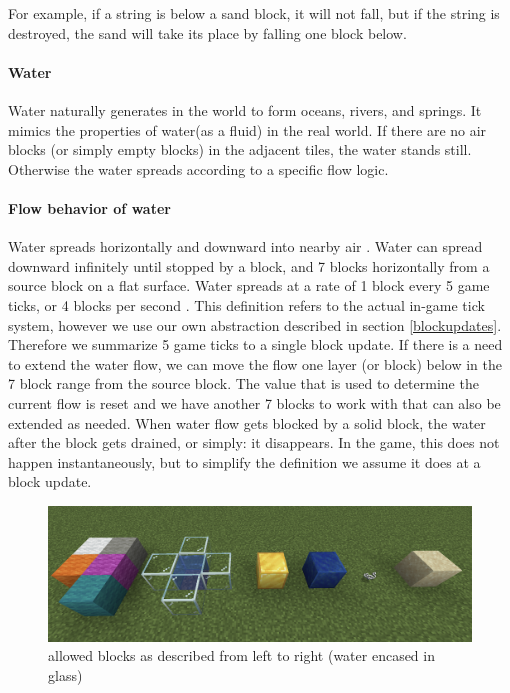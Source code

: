 \noindent \newline For example, if a string is below a sand block, it will not fall, but if the string is destroyed, the sand will take its place by falling one block below.

\pagebreak
\paragraph{Water}
Water naturally generates in the world to form oceans, rivers, and springs\cite{minecraftfandom:water}. 
It mimics the properties of water(as a fluid) in the real world.
If there are no air blocks (or simply empty blocks) in the adjacent tiles,
the water stands still. Otherwise the water spreads according to a specific flow logic.

\paragraph{Flow behavior of water}
Water spreads horizontally and downward into nearby air . Water can spread downward infinitely until stopped by a block, and 7 blocks horizontally from a source block on a flat surface. \newline Water spreads at a rate of 1 block every 5 game ticks, or 4 blocks per second \cite{minecraftfandom:waterspread}.\newline
\newline This definition refers to the actual in-game tick system, however we use our own abstraction described in section \ref{blockupdates}.
Therefore we summarize 5 game ticks to a single block update.
\newline If there is a need to extend the water flow, we can move the flow one layer (or block) below in the 7 block range from the source block.
The value that is used to determine the current flow is reset and we have another 7 blocks to work with that can also be extended as needed.
\newline When water flow gets blocked by a solid block, the water after the block gets drained, or simply: it disappears. In the game, this does not happen instantaneously, but to simplify the definition we assume it does at a block update.

\begin{figure}[h]
    \centering
    \includegraphics[width=\linewidth]{images/allowed blocks.png}
    \caption{allowed blocks as described from left to right (water encased in glass)}
    \label{fig:allowedblocks}
\end{figure}

